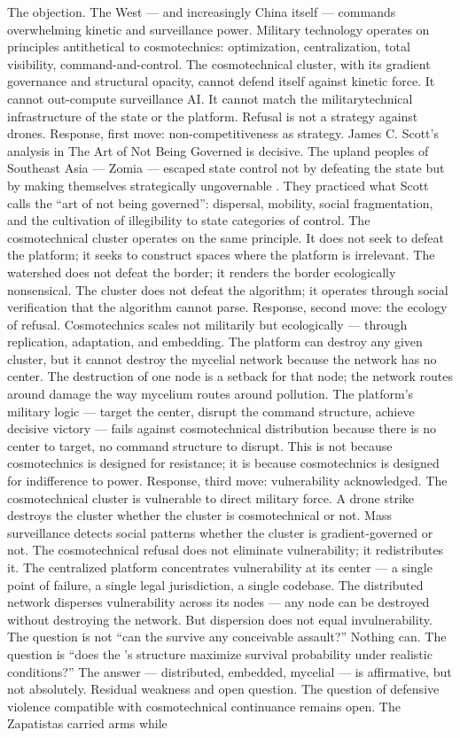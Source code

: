 The objection. The West — and increasingly China itself — commands overwhelming kinetic and surveillance power. Military technology operates on principles antithetical to cosmotechnics: optimization, centralization, total visibility, command-and-control. The cosmotechnical cluster, with its gradient governance and structural opacity, cannot defend itself against kinetic force. It cannot out-compute surveillance AI. It cannot match the militarytechnical infrastructure of the state or the platform. Refusal is not a strategy against drones. Response, first move: non-competitiveness as strategy. James C. Scott’s analysis in The Art of Not Being Governed is decisive. The upland peoples of Southeast Asia — Zomia — escaped state control not by defeating the state but by making themselves strategically ungovernable \cite{scott_2009}. They practiced what Scott calls the “art of not being governed”: dispersal, mobility, social fragmentation, and the cultivation of illegibility to state categories of control. The cosmotechnical cluster operates on the same principle. It does not seek to defeat the platform; it seeks to construct spaces where the platform is irrelevant. The watershed does not defeat the border; it renders the border ecologically nonsensical. The cluster does not defeat the algorithm; it operates through social verification that the algorithm cannot parse. Response, second move: the ecology of refusal. Cosmotechnics scales not militarily but ecologically — through replication, adaptation, and embedding. The platform can destroy any given cluster, but it cannot destroy the mycelial network because the network has no center. The destruction of one node is a setback for that node; the network routes around damage the way mycelium routes around pollution. The platform’s military logic — target the center, disrupt the command structure, achieve decisive victory — fails against cosmotechnical distribution because there is no center to target, no command structure to disrupt. This is not because cosmotechnics is designed for resistance; it is because cosmotechnics is designed for indifference to power. Response, third move: vulnerability acknowledged. The cosmotechnical cluster is vulnerable to direct military force. A drone strike destroys the cluster whether the cluster is cosmotechnical or not. Mass surveillance detects social patterns whether the cluster is gradient-governed or not. The cosmotechnical refusal does not eliminate vulnerability; it redistributes it. The centralized platform concentrates vulnerability at its center — a single point of failure, a single legal jurisdiction, a single codebase. The distributed  network disperses vulnerability across its nodes — any node can be destroyed without destroying the network. But dispersion does not equal invulnerability. The question is not “can the  survive any conceivable assault?” Nothing can. The question is “does the ’s structure maximize survival probability under realistic conditions?” The answer — distributed, embedded, mycelial — is affirmative, but not absolutely. Residual weakness and open question. The question of defensive violence compatible with cosmotechnical continuance remains open. The Zapatistas carried arms while 